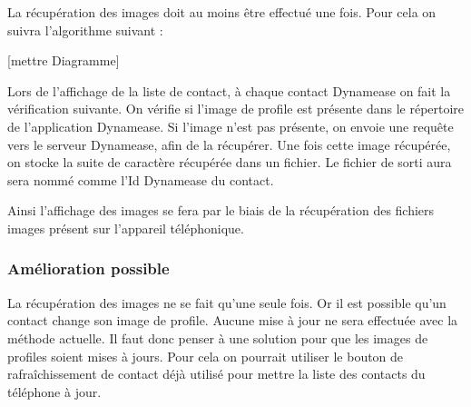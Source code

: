 La récupération des images doit au moins être effectué une fois. Pour cela on suivra l'algorithme suivant :

[mettre Diagramme]

Lors de l'affichage de la liste de contact, à chaque contact Dynamease on fait la vérification suivante. On vérifie si l'image de profile est présente dans le répertoire de l'application Dynamease. Si l'image n'est pas présente, on envoie une requête vers le serveur Dynamease, afin de la récupérer. Une fois cette image récupérée, on stocke la suite de caractère récupérée dans un fichier. Le fichier de sorti aura sera nommé comme l'Id Dynamease du contact.

Ainsi l'affichage des images se fera par le biais de la récupération des fichiers images présent sur l'appareil téléphonique.

\subsubsection{Amélioration possible}

La récupération des images ne se fait qu'une seule fois. Or il est possible qu'un contact change son image de profile. Aucune mise à jour ne sera effectuée avec la méthode actuelle. Il faut donc penser à une solution pour que les images de profiles soient mises à jours. Pour cela on pourrait utiliser le bouton de rafraîchissement de contact déjà utilisé pour mettre la liste des contacts du téléphone à jour. 
